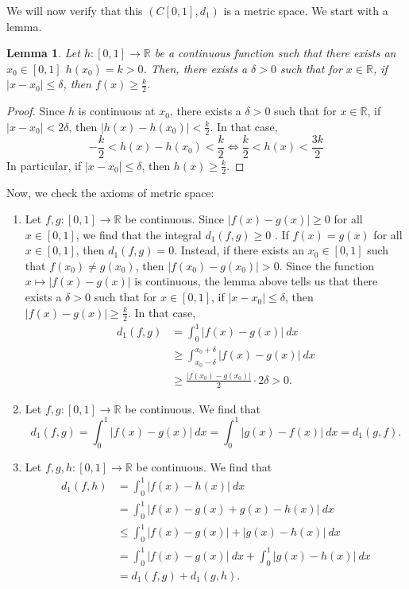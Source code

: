 \documentclass[a4paper, openany]{memoir}
\theoremstyle{definition}
\theoremstyle{plain}
\newtheorem{lemma}[definition]{Lemma}
\begin{document}
We will now verify that this $(C[0, 1], d_1)$ is a metric space. We start with a lemma.
\begin{lemma}
Let $h: [0, 1] \to \mathbb{R}$ be a continuous function such that there exists an $x_0 \in [0, 1]$ $h(x_0) = k > 0$. Then, there exists a $\delta > 0$ such that for $x \in \mathbb{R}$, if $|x - x_0| \leqslant \delta$, then $f(x) \geqslant \frac{k}{2}$.
\end{lemma}
\begin{proof}
Since $h$ is continuous at $x_0$, there exists a $\delta > 0$ such that for $x \in \mathbb{R}$, if $|x - x_0| < 2\delta$, then $|h(x) - h(x_0)| < \frac{k}{2}$. In that case,
\[-\frac{k}{2} < h(x) - h(x_0) < \frac{k}{2} \iff \frac{k}{2} < h(x) < \frac{3k}{2}\]
In particular, if $|x - x_0| \leqslant \delta$, then $h(x) \geqslant \frac{k}{2}$.
\end{proof}
\noindent Now, we check the axioms of metric space:
\begin{enumerate}[label=\textbf{M\arabic*}.]
    \item Let $f, g: [0, 1] \to \mathbb{R}$ be continuous. Since $|f(x) - g(x)| \geqslant 0$ for all $x \in [0, 1]$, we find that the integral $d_1(f, g) \geqslant 0$ . If $f(x) = g(x)$ for all $x \in [0, 1]$, then $d_1(f, g) = 0$. Instead, if there exists an $x_0 \in [0, 1]$ such that $f(x_0) \neq g(x_0)$, then $|f(x_0) - g(x_0)| > 0$. Since the function $x \mapsto |f(x) - g(x)|$ is continuous, the lemma above tells us that there exists a $\delta > 0$ such that for $x \in [0, 1]$, if $|x - x_0| \leqslant \delta$, then $|f(x) - g(x)| \geqslant \frac{k}{2}$. In that case,
    \begin{align*}
        d_1(f, g) &= \int_{0}^1 |f(x) - g(x)| \ dx \\
        &\geqslant \int_{x_0 - \delta}^{x_0 + \delta} |f(x) - g(x)| \ dx \\
        &\geqslant \frac{|f(x_0) - g(x_0)|}{2} \cdot 2\delta > 0.
    \end{align*}
    
    \item Let $f, g: [0, 1] \to \mathbb{R}$ be continuous. We find that
    \[d_1(f, g) = \int_0^1 |f(x) - g(x)| \ dx = \int_0^1 |g(x) - f(x)| \ dx = d_1(g, f).\]
    
    \item Let $f, g, h: [0, 1] \to \mathbb{R}$ be continuous. We find that
    \begin{align*}
        d_1(f, h) &= \int_0^1 |f(x) - h(x)| \ dx \\
        &= \int_0^1 |f(x) - g(x) + g(x) - h(x)| \ dx \\
        &\leqslant \int_0^1 |f(x) - g(x)| + |g(x) - h(x)| \ dx \\
        &= \int_0^1 |f(x) - g(x)| \ dx + \int_0^1 |g(x) - h(x)| \ dx \\
        &= d_1(f, g) + d_1(g, h).
    \end{align*}
\end{enumerate}
\end{document}
